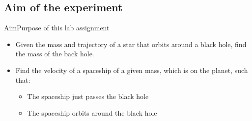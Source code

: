 





\subsection[Aim]{Aim of the experiment}
\begin{frame}{Aim}{Purpose of this lab assignment}
    \begin{itemize}
    \item Given the mass and trajectory of a star that orbits around a
    black hole, find the mass of the back hole.
    \item Find the velocity of a spaceship of a given mass, which is on the
    planet, such that:
        \begin{itemize}
        \item The spaceship just passes the black hole
        \item The spaceship orbits around the black hole
        \end{itemize}
    \end{itemize}
\end{frame}
